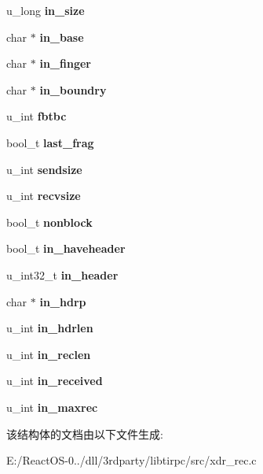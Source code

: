 \begin{DoxyCompactItemize}
u\+\_\+long {\bfseries in\+\_\+size}
\item 
\mbox{\label{structrec__strm_a4202ddb3d082a6caded0266896b230fd}} 
char $\ast$ {\bfseries in\+\_\+base}
\item 
\mbox{\label{structrec__strm_aaebe3923c31ad34b3aca3146ca392830}} 
char $\ast$ {\bfseries in\+\_\+finger}
\item 
\mbox{\label{structrec__strm_ac7081cbcd1340a3c1c3339fdb933dbaf}} 
char $\ast$ {\bfseries in\+\_\+boundry}
\item 
\mbox{\label{structrec__strm_a7513de30dcd70a123966f1a2e8662630}} 
u\+\_\+int {\bfseries fbtbc}
\item 
\mbox{\label{structrec__strm_a481f054af7c8aac168dc68d7c1dec15d}} 
bool\+\_\+t {\bfseries last\+\_\+frag}
\item 
\mbox{\label{structrec__strm_a5b535ba81a02a1e49fea0923bc925ce3}} 
u\+\_\+int {\bfseries sendsize}
\item 
\mbox{\label{structrec__strm_a124cd0699d268427899c12e1b401b068}} 
u\+\_\+int {\bfseries recvsize}
\item 
\mbox{\label{structrec__strm_a61ccb0258a25916efeb5989f53245a71}} 
bool\+\_\+t {\bfseries nonblock}
\item 
\mbox{\label{structrec__strm_aa73c45fcdeca7c54ab10dbdf24c234c3}} 
bool\+\_\+t {\bfseries in\+\_\+haveheader}
\item 
\mbox{\label{structrec__strm_acef71967f96d865c461d8907a95d3f0a}} 
u\+\_\+int32\+\_\+t {\bfseries in\+\_\+header}
\item 
\mbox{\label{structrec__strm_ae8932d25a761ba47bf2d649c35ae0a86}} 
char $\ast$ {\bfseries in\+\_\+hdrp}
\item 
\mbox{\label{structrec__strm_aec2d16ed9ecb16a407442dbb729c82c2}} 
u\+\_\+int {\bfseries in\+\_\+hdrlen}
\item 
\mbox{\label{structrec__strm_adf821bc4c21417150100ffc2bb1c7738}} 
u\+\_\+int {\bfseries in\+\_\+reclen}
\item 
\mbox{\label{structrec__strm_a1ba74c33be71612ba29b66d3fbd2a53c}} 
u\+\_\+int {\bfseries in\+\_\+received}
\item 
\mbox{\label{structrec__strm_adab631d317951cfc5ad1a5453728e61a}} 
u\+\_\+int {\bfseries in\+\_\+maxrec}
\end{DoxyCompactItemize}


该结构体的文档由以下文件生成\+:\begin{DoxyCompactItemize}
\item 
E\+:/\+React\+O\+S-\/0../dll/3rdparty/libtirpc/src/xdr\+\_\+rec.\+c\end{DoxyCompactItemize}
